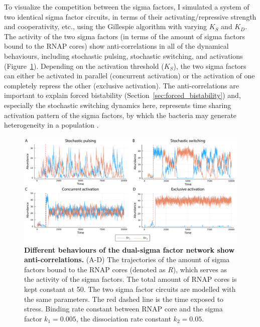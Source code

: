 To visualize the competition between the sigma factors,
I simulated a system of two identical sigma factor circuits, in terms of their
activating/repressive strength and cooperativity, etc., using the
Gillespie algorithm with varying $K_S$ and $K_D$.
The activity of the two sigma factors (in terms of the amount of 
sigma factors bound to the RNAP cores)
show anti-correlations in all of the dynamical behaviours,
including stochastic pulsing, stochastic switching, and activations
(Figure~\ref{fig:time_sharing}).
Depending on the activation threshold ($K_S$), the two sigma factors
can either be activated in parallel (concurrent activation) or the activation 
of one completely repress the other (exclusive activation).
The anti-correlations are important to explain forced bistability
(Section~\ref{sec:forced_bistability}) and,
especially the stochastic switching dynamics here,
represents time sharing activation pattern of the sigma factors,
by which the bacteria may generate heterogeneity in a population 
\cite{schwall21a}.

\begin{figure}[ht]
    \centering
    \includegraphics[width = 6in]{time_sharing.pdf}
    \caption[
        Different behaviours of the dual-sigma factor network show
        anti-correlations
        ]{
        \textbf{Different behaviours of the dual-sigma factor network show
        anti-correlations.}
        (A-D) The trajectories of the amount of sigma factors bound
        to the RNAP cores (denoted as $R$), which serves as the activity
        of the sigma factors.
        The total amount of RNAP cores is kept constant at 50.
        The two sigma factor circuits are modelled with the same parameters.
        The red dashed line is the time exposed to stress.
        Binding rate constant between RNAP core and the sigma factor
        $k_1 = 0.005$, the dissociation rate constant
        $k_2 = 0.05$.
    }
    \label{fig:time_sharing}
\end{figure}

